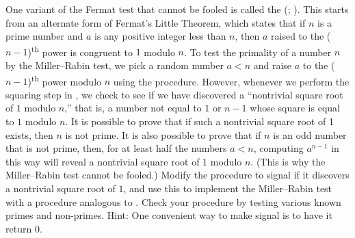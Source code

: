 \begin{exercise}
	\label{Exercise 1.28}
	One variant of the Fermat test that cannot be fooled is called the  (; ).
	This starts from an alternate form of Fermat’s Little Theorem, which states that if \( n \) is a prime number and \( a \) is any positive integer less than \( n \), then \( a \) raised to the (\( n - 1 \))\textsuperscript{th} power is congruent to \( 1 \) modulo \( n \).
	To test the primality of a number \( n \) by the Miller--Rabin test, we pick a random number \( a < n \) and raise \( a \) to the (\( n - 1 \))\textsuperscript{th} power modulo \( n \) using the  procedure.
	However, whenever we perform the squaring step in , we check to see if we have discovered a “nontrivial square root of \( 1 \) modulo \( n \),” that is, a number not equal to \( 1 \) or \( n - 1 \) whose square is equal to \( 1 \) modulo \( n \).
	It is possible to prove that if such a nontrivial square root of 1 exists, then \( n \) is not prime.
	It is also possible to prove that if \( n \) is an odd number that is not prime, then, for at least half the numbers \( a < n \), computing \( a^{n - 1} \) in this way will reveal a nontrivial square root of \( 1 \) modulo \( n \).
	(This is why the Miller--Rabin test cannot be fooled.)
	Modify the  procedure to signal if it discovers a nontrivial square root of \( 1 \), and use this to implement the Miller--Rabin test with a procedure analogous to .
	Check your procedure by testing various known primes and non-primes.
	Hint:
	One convenient way to make  signal is to have it return \( 0 \).
\end{exercise}
